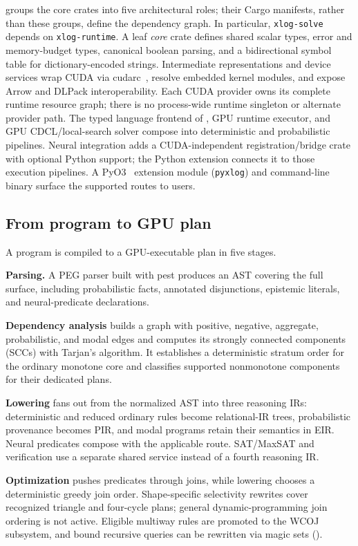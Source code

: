  groups the core crates into five architectural roles; their Cargo manifests, rather than these groups, define the dependency graph. In particular, \texttt{xlog-solve} depends on \texttt{xlog-runtime}. A leaf \emph{core} crate defines shared scalar types, error and memory-budget types, canonical boolean parsing, and a bidirectional symbol table for dictionary-encoded strings. Intermediate representations and device services wrap CUDA via cudarc~\cite{cudarc}, resolve embedded kernel modules, and expose Arrow and DLPack interoperability. Each CUDA provider owns its complete runtime resource graph; there is no process-wide runtime singleton or alternate provider path. The typed language frontend of , GPU runtime executor, and GPU CDCL/local-search solver compose into deterministic and probabilistic pipelines. Neural integration adds a CUDA-independent registration/bridge crate with optional Python support; the Python extension connects it to those execution pipelines. A PyO3~\cite{pyo3} extension module (\texttt{pyxlog}) and command-line binary surface the supported routes to users.

\subsection{From program to GPU plan}

A program is compiled to a GPU-executable plan in five stages.

\textbf{Parsing.} A PEG parser built with pest produces an AST covering the full surface, including probabilistic facts, annotated disjunctions, epistemic literals, and neural-predicate declarations.

\textbf{Dependency analysis} builds a graph with positive, negative, aggregate, probabilistic, and modal edges and computes its strongly connected components (SCCs) with Tarjan's algorithm. It establishes a deterministic stratum order for the ordinary monotone core and classifies supported nonmonotone components for their dedicated plans.

\textbf{Lowering} fans out from the normalized AST into three reasoning IRs: deterministic and reduced ordinary rules become relational-IR trees, probabilistic provenance becomes PIR, and modal programs retain their semantics in EIR. Neural predicates compose with the applicable route. SAT/MaxSAT and verification use a separate shared service instead of a fourth reasoning IR.

\textbf{Optimization} pushes predicates through joins, while lowering chooses a deterministic greedy join order. Shape-specific selectivity rewrites cover recognized triangle and four-cycle plans; general dynamic-programming join ordering is not active. Eligible multiway rules are promoted to the WCOJ subsystem, and bound recursive queries can be rewritten via magic sets ().

